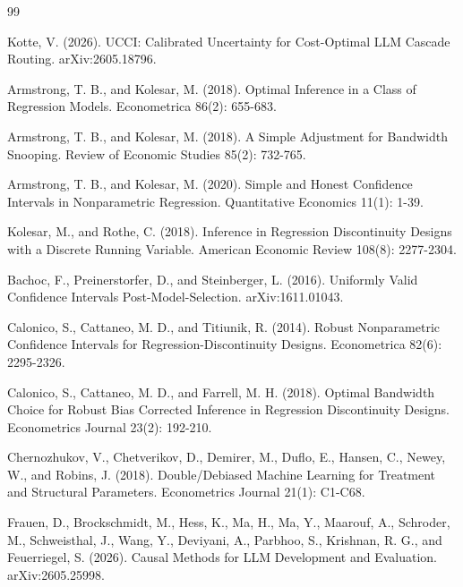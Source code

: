 \documentclass{article}
\begin{document}
\begin{thebibliography}{99}

   Kotte, V. (2026). UCCI: Calibrated Uncertainty for Cost-Optimal LLM Cascade Routing. arXiv:2605.18796.

   Armstrong, T. B., and Kolesar, M. (2018). Optimal Inference in a Class of Regression Models. Econometrica 86(2): 655-683.

   Armstrong, T. B., and Kolesar, M. (2018). A Simple Adjustment for Bandwidth Snooping. Review of Economic Studies 85(2): 732-765.

   Armstrong, T. B., and Kolesar, M. (2020). Simple and Honest Confidence Intervals in Nonparametric Regression. Quantitative Economics 11(1): 1-39.

   Kolesar, M., and Rothe, C. (2018). Inference in Regression Discontinuity Designs with a Discrete Running Variable. American Economic Review 108(8): 2277-2304.

   Bachoc, F., Preinerstorfer, D., and Steinberger, L. (2016). Uniformly Valid Confidence Intervals Post-Model-Selection. arXiv:1611.01043.

   Calonico, S., Cattaneo, M. D., and Titiunik, R. (2014). Robust Nonparametric Confidence Intervals for Regression-Discontinuity Designs. Econometrica 82(6): 2295-2326.

   Calonico, S., Cattaneo, M. D., and Farrell, M. H. (2018). Optimal Bandwidth Choice for Robust Bias Corrected Inference in Regression Discontinuity Designs. Econometrics Journal 23(2): 192-210.

   Chernozhukov, V., Chetverikov, D., Demirer, M., Duflo, E., Hansen, C., Newey, W., and Robins, J. (2018). Double/Debiased Machine Learning for Treatment and Structural Parameters. Econometrics Journal 21(1): C1-C68.

   Frauen, D., Brockschmidt, M., Hess, K., Ma, H., Ma, Y., Maarouf, A., Schroder, M., Schweisthal, J., Wang, Y., Deviyani, A., Parbhoo, S., Krishnan, R. G., and Feuerriegel, S. (2026). Causal Methods for LLM Development and Evaluation. arXiv:2605.25998.


\end{thebibliography}
\end{document}
